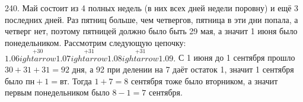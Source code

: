 240. Май состоит из 4 полных недель (в них всех дней недели поровну) и ещё 3 последних дней. Раз пятниц больше, чем четвергов, пятница в эти дни попала, а четверг нет, поэтому пятницей должно было быть 29 мая, а значит 1 июня было понедельником. Рассмотрим следующую цепочку:
$1.06\stackrel{+30}{
ightarrow}1.07\stackrel{+31}{
ightarrow}1.08\stackrel{+31}{
ightarrow}1.09.$ С 1 июня до 1 сентября прошло $30+31+31=92$ дня, а 92 при делении на 7 даёт остаток 1, значит 1 сентября было $\text{пн}+1=\text{вт}.$ Тогда $1+7=8$ сентября тоже было вторником, а значит первым понедельником было $8-1=7$ сентября.\\
